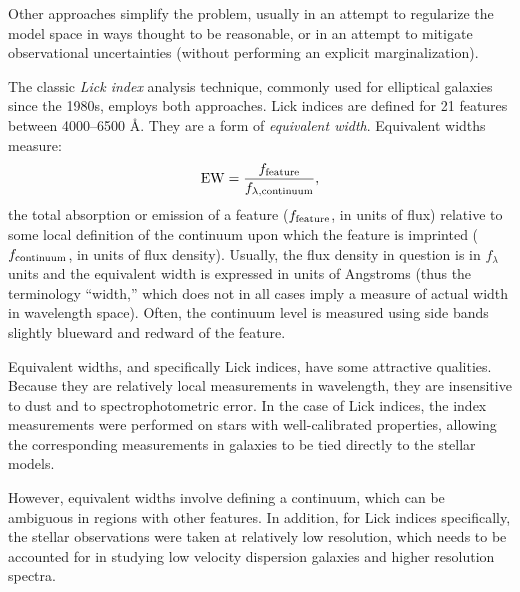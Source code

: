 Other approaches simplify the problem, usually in an attempt to
regularize the model space in ways thought to be reasonable, or in an
attempt to mitigate observational uncertainties (without performing an
explicit marginalization).

The classic {\it Lick index} analysis technique, commonly used for
elliptical galaxies since the 1980s, employs both approaches. Lick
indices are defined for 21 features between 4000--6500 \AA. They are a
form of {\it equivalent width}. Equivalent widths measure:
\begin{equation}
{\rm EW} = \frac{f_{\rm feature}}{f_{\lambda, {\rm continuum}}},
\end{equation}
the total absorption or emission of a feature ($f_{\rm feature}$, in
units of flux) relative to some local definition of the continuum upon
which the feature is imprinted ($f_{\rm continuum}$, in units of flux
density). Usually, the flux density in question is in $f_\lambda$
units and the equivalent width is expressed in units of Angstroms
(thus the terminology ``width,'' which does not in all cases imply a
measure of actual width in wavelength space). Often, the continuum
level is measured using side bands slightly blueward and redward of
the feature.

Equivalent widths, and specifically Lick indices, have some attractive
qualities. Because they are relatively local measurements in
wavelength, they are insensitive to dust and to spectrophotometric
error. In the case of Lick indices, the index measurements were
performed on stars with well-calibrated properties, allowing the
corresponding measurements in galaxies to be tied directly to the
stellar models.

However, equivalent widths involve defining a continuum, which can be
ambiguous in regions with other features.  In addition, for Lick
indices specifically, the stellar observations were taken at
relatively low resolution, which needs to be accounted for in studying
low velocity dispersion galaxies and higher resolution spectra. 

